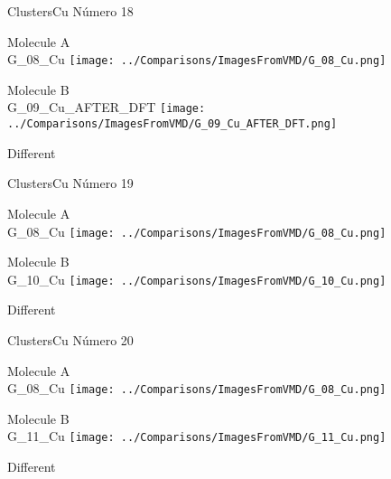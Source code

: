 \vtab[-3cm]
\begin{center}
{\large ClustersCu \tab Número 18}
\end{center}
\begin{multicols}{2}
\begin{center}
Molecule A \\ 
G\_08\_Cu
\texttt{[image: ../Comparisons/ImagesFromVMD/G\_08\_Cu.png]}
\\
\vtab

\columnbreak
Molecule B \\ 
G\_09\_Cu\_AFTER\_DFT
\texttt{[image: ../Comparisons/ImagesFromVMD/G\_09\_Cu\_AFTER\_DFT.png]}
\\
\vtab


\end{center}
\end{multicols}
\begin{center}
\textcolor{NavyBlue}{\Large Different}
\end{center}

 \newpage

\vtab[-3cm]
\begin{center}
{\large ClustersCu \tab Número 19}
\end{center}
\begin{multicols}{2}
\begin{center}
Molecule A \\ 
G\_08\_Cu
\texttt{[image: ../Comparisons/ImagesFromVMD/G\_08\_Cu.png]}
\\
\vtab

\columnbreak
Molecule B \\ 
G\_10\_Cu
\texttt{[image: ../Comparisons/ImagesFromVMD/G\_10\_Cu.png]}
\\
\vtab


\end{center}
\end{multicols}
\begin{center}
\textcolor{NavyBlue}{\Large Different}
\end{center}

 \newpage

\vtab[-3cm]
\begin{center}
{\large ClustersCu \tab Número 20}
\end{center}
\begin{multicols}{2}
\begin{center}
Molecule A \\ 
G\_08\_Cu
\texttt{[image: ../Comparisons/ImagesFromVMD/G\_08\_Cu.png]}
\\
\vtab

\columnbreak
Molecule B \\ 
G\_11\_Cu
\texttt{[image: ../Comparisons/ImagesFromVMD/G\_11\_Cu.png]}
\\
\vtab


\end{center}
\end{multicols}
\begin{center}
\textcolor{NavyBlue}{\Large Different}
\end{center}

